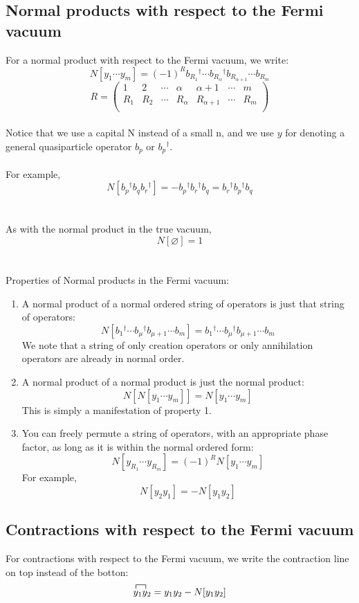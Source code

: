\documentclass{article}
\newcommand{\fctr}{\contraction}
\newcommand{\dg}{\ensuremath{^\dagger} }
\newcommand{\cd}{\ensuremath{\cdots} }
\begin{document}
\subsection{Normal products with respect to the Fermi vacuum }
For a normal product with respect to the Fermi vacuum, we write: 
\[N[y_1 \cd y_m]= (-1)^R b_{R_1}\dg \cd b_{R_\alpha}\dg b_{R_{\alpha+1}} \cd b_{R_m} \]
\[
R = 
\begin{pmatrix}
1 & 2 &\cd & \alpha & \alpha+1 & \cd & m  \\
R_1 & R_2 &\cd & R_\alpha& R_{\alpha+1} & \cd & R_m  \\
\end{pmatrix}
\] \\
Notice that we use a capital N instead of a small n, and we use $y$ for denoting a general quasiparticle operator $b_p$ or $b_p\dg$. 
\\ \\
For example,
\[N[b_p\dg b_q b_r\dg] = -b_p\dg b_r\dg b_q = b_r\dg b_p\dg b_q\]
\\ \\
As with the normal product in the true vacuum, 
\[N[\varnothing] = 1\]
\\ \\
Properties of Normal products in the Fermi vacuum: 
\begin{enumerate}
\item A normal product of a normal ordered string of operators is just that string of operators:
\[N[b_{1}\dg \cd b_{\mu}\dg b_{\mu+1} \cd b_{m} ] = b_{1}\dg \cd b_{\mu}\dg b_{{\mu+1}} \cd b_{m}  \]
We note that a string of only creation operators or only annihilation operators are already in normal order.
\item A normal product of a normal product is just the normal product:
\[N[N[y_1 \cd y_m]] = N[y_1 \cd y_m] \]
This is simply a manifestation of property 1.
\item You can freely permute a string of operators, with an appropriate phase factor, as long as it is within the normal ordered form:
\[N[y_{R_1} \cd y_{R_m} ] = (-1)^R N[ y_1 \cd y_m]\]
For example,
\[N[y_2 y_1] = -N[y_1 y_2] \]
\end{enumerate}

\subsection{Contractions with respect to the Fermi vacuum }

For contractions with respect to the Fermi vacuum, we write the contraction line on top instead of the botton: 
$$
\fctr{}{y}{{}_1}{y}
y_1 y_2 = y_1y_2 - N[y_1y_2]
$$
\end{document}

